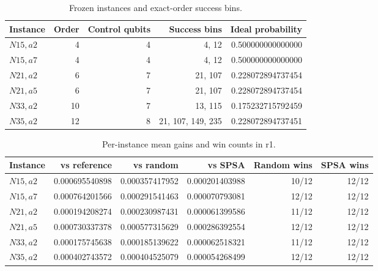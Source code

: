 \documentclass[11pt]{article}
\begin{document}
\begin{table}[h]
\centering
\caption{Frozen instances and exact-order success bins.}
\label{tab:instances}
\begin{tabular}{lrrrr}
\toprule
Instance & Order & Control qubits & Success bins & Ideal probability\\
\midrule
$N15,a2$ & 4 & 4 & 4, 12 & 0.500000000000000\\
$N15,a7$ & 4 & 4 & 4, 12 & 0.500000000000000\\
$N21,a2$ & 6 & 7 & 21, 107 & 0.228072894737454\\
$N21,a5$ & 6 & 7 & 21, 107 & 0.228072894737454\\
$N33,a2$ & 10 & 7 & 13, 115 & 0.175232715792459\\
$N35,a2$ & 12 & 8 & 21, 107, 149, 235 & 0.228072894737451\\
\bottomrule
\end{tabular}
\end{table}

\begin{table}[h]
\centering
\caption{Per-instance mean gains and win counts in r1.}
\label{tab:wins}
\begin{tabular}{lrrrrr}
\toprule
Instance & vs reference & vs random & vs SPSA & Random wins & SPSA wins\\
\midrule
$N15,a2$ & 0.000695540898 & 0.000357417952 & 0.000201403988 & 10/12 & 12/12\\
$N15,a7$ & 0.000764201566 & 0.000291541463 & 0.000070793081 & 12/12 & 12/12\\
$N21,a2$ & 0.000194208274 & 0.000230987431 & 0.000061399586 & 11/12 & 12/12\\
$N21,a5$ & 0.000730337378 & 0.000577315629 & 0.000286392554 & 12/12 & 12/12\\
$N33,a2$ & 0.000175745638 & 0.000185139622 & 0.000062518321 & 11/12 & 12/12\\
$N35,a2$ & 0.000402743572 & 0.000404525079 & 0.000054268499 & 12/12 & 12/12\\
\bottomrule
\end{tabular}
\end{table}
\end{document}

